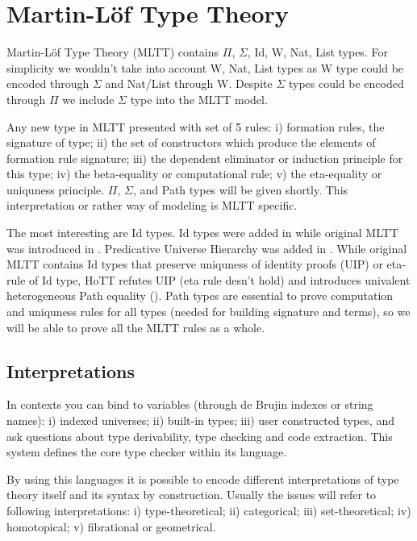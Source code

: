 \documentclass{article}
\theoremstyle{definition}
\begin{document}
\section{Martin-Löf Type Theory}

Martin-Löf Type Theory (MLTT) contains $\Pi$, $\Sigma$, Id, W, Nat, List types.
For simplicity we wouldn't take into account W, Nat, List types as
W type could be encoded through $\Sigma$ and Nat/List through W.
Despite $\Sigma$ types could be encoded through $\Pi$ we include $\Sigma$ type into the MLTT model.

Any new type in MLTT presented with set of 5 rules: i) formation rules, the signature of type;
ii) the set of constructors which produce the elements of formation rule signature;
iii) the dependent eliminator or induction principle for this type;
iv) the beta-equality or computational rule;
v) the eta-equality or uniquness principle. $\Pi$, $\Sigma$, and Path
types will be given shortly. This interpretation or rather way of modeling is MLTT specific.

The most interesting are Id types. Id types were added in \cite{Lof84} while original MLTT was introduced in \cite{Lof72}.
Predicative Universe Hierarchy was added in \cite{Lof75}.
While original MLTT contains Id types that preserve uniquness of identity
proofs (UIP) or eta-rule of Id type, HoTT refutes UIP (eta rule desn't hold)
and introduces univalent heterogeneous Path equality (\cite{Hofmann96}).
Path types are essential to prove computation and uniquness rules for all types
(needed for building signature and terms), so we will be able to prove all
the MLTT rules as a whole.

\subsection{Interpretations}

In contexts you can bind to variables (through de Brujin indexes or string names):
i) indexed universes; ii) built-in types; iii) user constructed types, and ask
questions about type derivability, type checking and code extraction. This system
defines the core type checker within its language.

By using this languages it is possible to encode different interpretations of
type theory itself and its syntax by construction. Usually the issues will refer to
following interpretations: i) type-theoretical; ii) categorical;
iii) set-theoretical; iv) homotopical; v) fibrational or geometrical.
\end{document}

